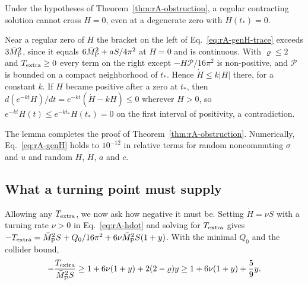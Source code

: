 \begin{rAlemma}\label{lem:rA-crossing}
Under the hypotheses of Theorem~\ref{thm:rA-obstruction}, a regular contracting solution cannot cross $H=0$, even at a degenerate zero with $\dot H(t_*)=0$.
\end{rAlemma}

\begin{rAproof}
Near a regular zero of $H$ the bracket on the left of Eq.~\eqref{eq:rA-genH-trace} exceeds $3\bar M_{\mathrm{P}}^2$, since it equals $6\bar M_{\mathrm{P}}^2+aS/4\pi^2$ at $H=0$ and is continuous.
With $\varrho\leq2$ and $T_{\rm extra}\geq0$ every term on the right except $-H\mathcal P/16\pi^2$ is non-positive, and $\mathcal P$ is bounded on a compact neighborhood of $t_*$.
Hence $\dot H\leq k|H|$ there, for a constant $k$.
If $H$ became positive after a zero at $t_*$, then $d(e^{-kt}H)/dt=e^{-kt}(\dot H-kH)\leq0$ wherever $H>0$, so $e^{-kt}H(t)\leq e^{-kt_*}H(t_*)=0$ on the first interval of positivity, a contradiction.
\end{rAproof}

The lemma completes the proof of Theorem~\ref{thm:rA-obstruction}.
Numerically, Eq.~\eqref{eq:rA-genH} holds to $10^{-12}$ in relative terms for random noncommuting $\sigma$ and $u$ and random $H$, $\dot H$, $a$ and $c$. %

\subsection{What a turning point must supply}
\label{rA:supply}

Allowing any $T_{\rm extra}$, we now ask how negative it must be.
Setting $\dot H=\nu S$ with a turning rate $\nu>0$ in Eq.~\eqref{eq:rA-hdot} and solving for $T_{\rm extra}$ gives $-T_{\rm extra}=\bar M_{\mathrm{P}}^2S+Q_0/16\pi^2+6\nu\bar M_{\mathrm{P}}^2S(1+y)$.
With the minimal $Q_0$ and the collider bound,
\begin{equation}
-\frac{T_{\rm extra}}{\bar M_{\mathrm{P}}^2S}\geq1+6\nu(1+y)+2(2-\varrho)y\geq1+6\nu(1+y)+\frac59y .
\label{eq:rA-budget}
\end{equation}


